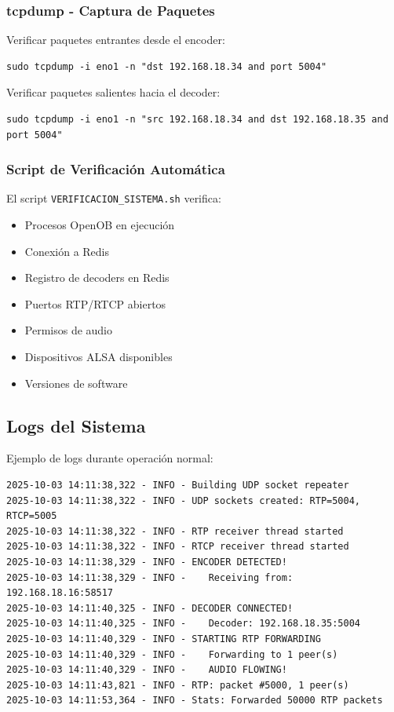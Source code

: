 \documentclass[12pt,a4paper]{article}
\begin{document}
\subsubsection{tcpdump - Captura de Paquetes}

Verificar paquetes entrantes desde el encoder:

\begin{lstlisting}[style=bashstyle]
sudo tcpdump -i eno1 -n "dst 192.168.18.34 and port 5004"
\end{lstlisting}

Verificar paquetes salientes hacia el decoder:

\begin{lstlisting}[style=bashstyle]
sudo tcpdump -i eno1 -n "src 192.168.18.34 and dst 192.168.18.35 and port 5004"
\end{lstlisting}

\subsubsection{Script de Verificación Automática}

El script \texttt{VERIFICACION\_SISTEMA.sh} verifica:

\begin{itemize}
    \item Procesos OpenOB en ejecución
    \item Conexión a Redis
    \item Registro de decoders en Redis
    \item Puertos RTP/RTCP abiertos
    \item Permisos de audio
    \item Dispositivos ALSA disponibles
    \item Versiones de software
\end{itemize}

\subsection{Logs del Sistema}

Ejemplo de logs durante operación normal:

\begin{lstlisting}[style=bashstyle, caption={Logs del repeater}, label={lst:logs}]
2025-10-03 14:11:38,322 - INFO - Building UDP socket repeater
2025-10-03 14:11:38,322 - INFO - UDP sockets created: RTP=5004, RTCP=5005
2025-10-03 14:11:38,322 - INFO - RTP receiver thread started
2025-10-03 14:11:38,322 - INFO - RTCP receiver thread started
2025-10-03 14:11:38,329 - INFO - ENCODER DETECTED!
2025-10-03 14:11:38,329 - INFO -    Receiving from: 192.168.18.16:58517
2025-10-03 14:11:40,325 - INFO - DECODER CONNECTED!
2025-10-03 14:11:40,325 - INFO -    Decoder: 192.168.18.35:5004
2025-10-03 14:11:40,329 - INFO - STARTING RTP FORWARDING
2025-10-03 14:11:40,329 - INFO -    Forwarding to 1 peer(s)
2025-10-03 14:11:40,329 - INFO -    AUDIO FLOWING!
2025-10-03 14:11:43,821 - INFO - RTP: packet #5000, 1 peer(s)
2025-10-03 14:11:53,364 - INFO - Stats: Forwarded 50000 RTP packets
\end{lstlisting}
\end{document}

